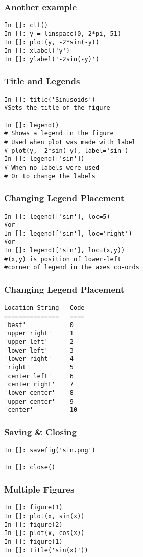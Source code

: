 \documentclass[14pt,compress]{beamer}
\begin{document}
\begin{frame}[fragile]
\frametitle{Another example}
  \begin{lstlisting}
In []: clf()
In []: y = linspace(0, 2*pi, 51)
In []: plot(y, -2*sin(-y))
In []: xlabel('y')
In []: ylabel('-2sin(-y)')
  \end{lstlisting}
\end{frame}

\begin{frame}[fragile]
\frametitle{Title and Legends}
\begin{lstlisting}
In []: title('Sinusoids')
#Sets the title of the figure

In []: legend() 
# Shows a legend in the figure
# Used when plot was made with label
# plot(y, -2*sin(-y), label='sin')
In []: legend(['sin'])
# When no labels were used
# Or to change the labels

\end{lstlisting}
\end{frame}

\begin{frame}[fragile]
\frametitle{Changing Legend Placement}
\begin{lstlisting}
In []: legend(['sin'], loc=5) 
#or 
In []: legend(['sin'], loc='right') 
#or
In []: legend(['sin'], loc=(x,y)) 
#(x,y) is position of lower-left 
#corner of legend in the axes co-ords
\end{lstlisting}
\end{frame}

\begin{frame}[fragile]
\frametitle{Changing Legend Placement}
\vspace{-0.15in}
\begin{lstlisting}
Location String   Code
===============   ====
'best'            0
'upper right'     1
'upper left'      2
'lower left'      3
'lower right'     4
'right'           5
'center left'     6
'center right'    7
'lower center'    8
'upper center'    9
'center'          10
\end{lstlisting}
\end{frame}


\begin{frame}[fragile]
\frametitle{Saving \& Closing}
\begin{lstlisting}
In []: savefig('sin.png')

In []: close()
\end{lstlisting}
\end{frame}

\begin{frame}[fragile]
\frametitle{Multiple Figures}
\begin{lstlisting}
In []: figure(1)
In []: plot(x, sin(x))
In []: figure(2)
In []: plot(x, cos(x))
In []: figure(1)
In []: title('sin(x)'))
\end{lstlisting}
\end{frame}
\end{document}
